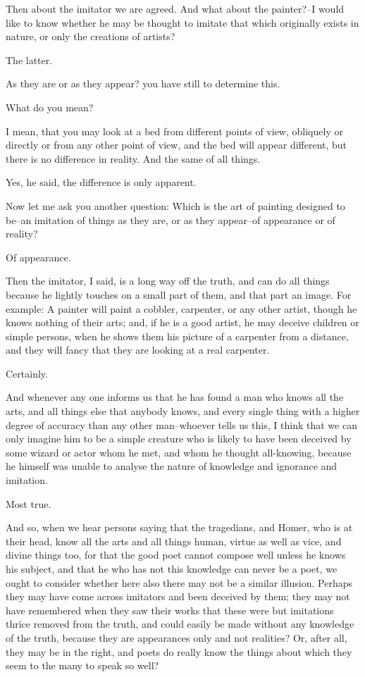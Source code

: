 Then about the imitator we are agreed. And what about the painter?--I
would like to know whether he may be thought to imitate that which
originally exists in nature, or only the creations of artists?

The latter.

As they are or as they appear? you have still to determine this.

What do you mean?

I mean, that you may look at a bed from different points of view,
obliquely or directly or from any other point of view, and the bed will
appear different, but there is no difference in reality. And the same of
all things.

Yes, he said, the difference is only apparent.

Now let me ask you another question: Which is the art of painting
designed to be--an imitation of things as they are, or as they
appear--of appearance or of reality?

Of appearance.

Then the imitator, I said, is a long way off the truth, and can do all
things because he lightly touches on a small part of them, and that part
an image. For example: A painter will paint a cobbler, carpenter, or
any other artist, though he knows nothing of their arts; and, if he is
a good artist, he may deceive children or simple persons, when he shows
them his picture of a carpenter from a distance, and they will fancy
that they are looking at a real carpenter.

Certainly.

And whenever any one informs us that he has found a man who knows all
the arts, and all things else that anybody knows, and every single thing
with a higher degree of accuracy than any other man--whoever tells us
this, I think that we can only imagine him to be a simple creature who
is likely to have been deceived by some wizard or actor whom he met, and
whom he thought all-knowing, because he himself was unable to analyse
the nature of knowledge and ignorance and imitation.

Most true.

And so, when we hear persons saying that the tragedians, and Homer, who
is at their head, know all the arts and all things human, virtue as well
as vice, and divine things too, for that the good poet cannot compose
well unless he knows his subject, and that he who has not this knowledge
can never be a poet, we ought to consider whether here also there may
not be a similar illusion. Perhaps they may have come across imitators
and been deceived by them; they may not have remembered when they saw
their works that these were but imitations thrice removed from the
truth, and could easily be made without any knowledge of the truth,
because they are appearances only and not realities? Or, after all, they
may be in the right, and poets do really know the things about which
they seem to the many to speak so well?

